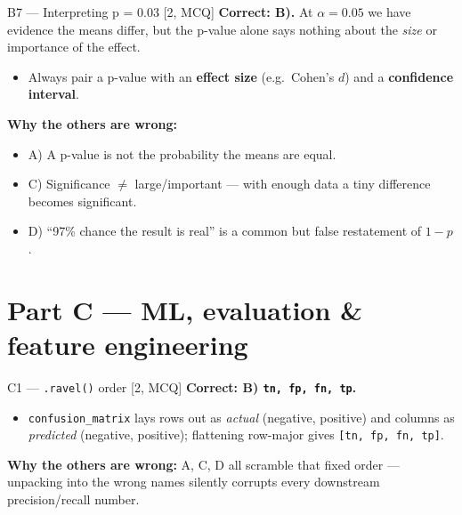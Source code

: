 \documentclass[aspectratio=169,11pt]{beamer}
\begin{document}
\begin{frame}{B7 --- Interpreting p = 0.03 \hfill [2, MCQ]}
\textbf{Correct: B).} At $\alpha = 0.05$ we have evidence the means differ, but the p-value alone says nothing about the \emph{size} or importance of the effect.
\begin{itemize}
  \item Always pair a p-value with an \textbf{effect size} (e.g.\ Cohen's $d$) and a \textbf{confidence interval}.
\end{itemize}
\textbf{Why the others are wrong:}
\begin{itemize}
  \item A) A p-value is not the probability the means are equal.
  \item C) Significance $\neq$ large/important --- with enough data a tiny difference becomes significant.
  \item D) ``97\% chance the result is real'' is a common but false restatement of $1-p$.
\end{itemize}
\end{frame}

\section{Part C --- ML, evaluation \& feature engineering}

\begin{frame}[fragile]{C1 --- \texttt{.ravel()} order \hfill [2, MCQ]}
\textbf{Correct: B) \texttt{tn, fp, fn, tp}.}
\begin{itemize}
  \item \texttt{confusion\_matrix} lays rows out as \emph{actual} (negative, positive) and columns as \emph{predicted} (negative, positive); flattening row-major gives \texttt{[tn, fp, fn, tp]}.
\end{itemize}
\textbf{Why the others are wrong:} A, C, D all scramble that fixed order --- unpacking into the wrong names silently corrupts every downstream precision/recall number.
\end{frame}
\end{document}
